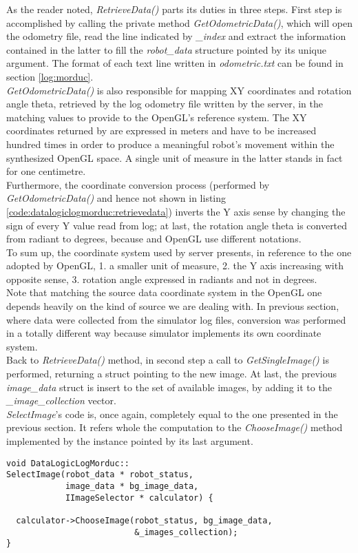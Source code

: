 As the reader noted, \textit{RetrieveData()} parts its duties in
three steps. First step is accomplished by calling the private method
\textit{GetOdometricData()}, which will open the odometry file, read
the line indicated by \textit{\_index} and extract the information
contained in the latter to fill the \textit{robot\_data} structure
pointed by its unique argument. The format of each text line written in
\textit{odometric.txt} can be found in section \ref{log:morduc}.
\\
\textit{GetOdometricData()} is also responsible for mapping XY
coordinates and rotation angle theta, retrieved by the log
odometry file written by the \morduc{} server, in the matching values
to provide to the OpenGL's reference system. The XY coordinates returned
by \morduc{} are expressed in meters and have to be increased hundred
times in order to produce a meaningful robot's movement within the
synthesized OpenGL space. A single unit of measure in the latter stands
in fact for one centimetre.
\\
Furthermore, the coordinate conversion process (performed by  
\textit{GetOdometricData()} and hence not shown in listing 
\ref{code:datalogiclogmorduc:retrievedata}) inverts the Y axis sense
by changing the sign of every Y value read from log; at last, the
rotation angle theta is converted from radiant to degrees, because
\morduc{} and OpenGL use different notations.
\\
To sum up, the coordinate system used by \morduc{} server presents,
in reference to the one adopted by OpenGL, 1. a smaller unit of
measure, 2. the Y axis increasing with opposite sense, 3. rotation
angle expressed in radiants and not in degrees.
\\
Note that matching the source data coordinate system in the OpenGL one
depends heavily on the  kind of source we are dealing with. In previous
section, where data were collected from the simulator log files, conversion
was
performed in a totally different way because simulator implements
its own coordinate system.
\\
Back to \textit{RetrieveData()} method, in second step a call to
\textit{GetSingleImage()} is performed,
returning a struct pointing to the new image.
At last, the previous \textit{image\_data} struct is insert to the set
of available images, by adding it to the \textit{\_image\_collection}
vector.
\\
\textit{SelectImage}'s code is, once again, completely equal to the one
presented in the previous section. It refers whole the computation to the
\textit{ChooseImage()} method implemented by the instance pointed by
its last argument.
\\
\begin{lstlisting}[caption={\texttt{DataLogicLogMorduc::SelectImage()} method},
    label={code:datalogiclogmorduc:selectimage}]
void DataLogicLogMorduc::
SelectImage(robot_data * robot_status,
            image_data * bg_image_data,
            IImageSelector * calculator) {

  calculator->ChooseImage(robot_status, bg_image_data,
                          &_images_collection);
}

\end{lstlisting}

